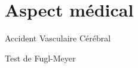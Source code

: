 \section{Aspect médical}

\begin{frame}{Accident Vasculaire Cérébral}
\end{frame}

\begin{frame}{Test de Fugl-Meyer}
\end{frame}